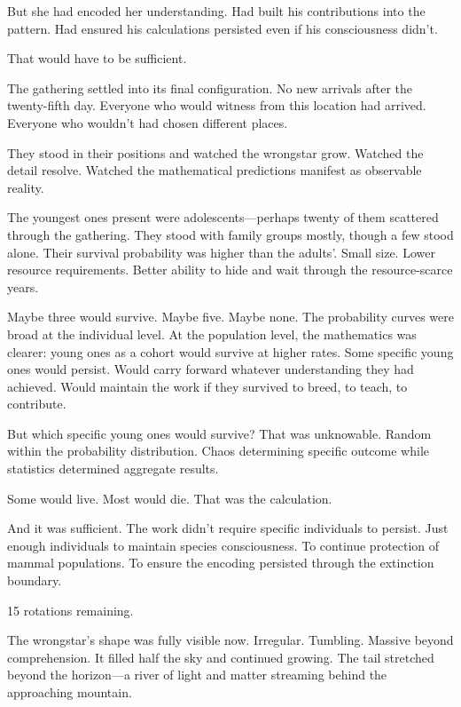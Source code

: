 But she had encoded her understanding. Had built his contributions into the pattern. Had ensured his calculations persisted even if his consciousness didn't.

That would have to be sufficient.

\scenebreak

The gathering settled into its final configuration. No new arrivals after the twenty-fifth day. Everyone who would witness from this location had arrived. Everyone who wouldn't had chosen different places.

They stood in their positions and watched the wrongstar grow. Watched the detail resolve. Watched the mathematical predictions manifest as observable reality.

The youngest ones present were adolescents—perhaps twenty of them scattered through the gathering. They stood with family groups mostly, though a few stood alone. Their survival probability was higher than the adults'. Small size. Lower resource requirements. Better ability to hide and wait through the resource-scarce years.

Maybe three would survive. Maybe five. Maybe none. The probability curves were broad at the individual level. At the population level, the mathematics was clearer: young ones as a cohort would survive at higher rates. Some specific young ones would persist. Would carry forward whatever understanding they had achieved. Would maintain the work if they survived to breed, to teach, to contribute.

But which specific young ones would survive? That was unknowable. Random within the probability distribution. Chaos determining specific outcome while statistics determined aggregate results.

Some would live. Most would die. That was the calculation.

And it was sufficient. The work didn't require specific individuals to persist. Just enough individuals to maintain species consciousness. To continue protection of mammal populations. To ensure the encoding persisted through the extinction boundary.

\scenebreak

15 rotations remaining.

The wrongstar's shape was fully visible now. Irregular. Tumbling. Massive beyond comprehension. It filled half the sky and continued growing. The tail stretched beyond the horizon—a river of light and matter streaming behind the approaching mountain.

